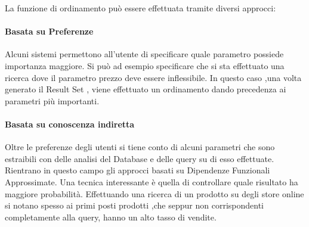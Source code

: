 La funzione di ordinamento può essere effettuata tramite diversi approcci:
\paragraph{Basata su Preferenze}
Alcuni sistemi permettono all'utente di specificare quale parametro possiede importanza maggiore. Si può ad esempio specificare che si sta effettuato una ricerca dove il parametro prezzo deve essere inflessibile. In questo caso ,una volta generato il Result Set , viene effettuato un ordinamento dando precedenza ai parametri più importanti.\cite{query_answering}
\paragraph{Basata su conoscenza indiretta}
Oltre le preferenze degli utenti si tiene conto di alcuni parametri che sono estraibili con delle analisi del Database e delle query su di esso effettuate.
Rientrano in questo campo gli approcci basati su Dipendenze Funzionali Approssimate.
Una tecnica interessante è quella di controllare quale risultato ha maggiore probabilità. Effettuando una ricerca di un prodotto su degli store online si notano spesso ai primi posti prodotti ,che seppur non corrispondenti completamente alla query, hanno un alto tasso di vendite. 


